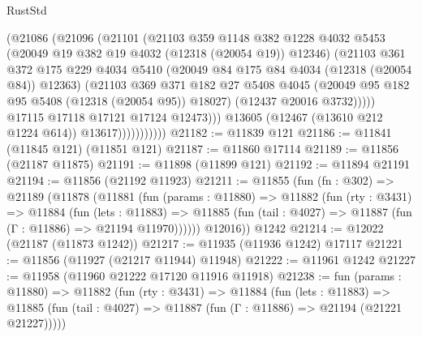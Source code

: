 \begin{lexlean}{RustStd}
\begin{coremodule}
                            (@21086
                              (@21096
                                (@21101
                                  (@21103
                                    @359
                                    @1148
                                    @382
                                    @1228
                                    @4032
                                    @5453
                                    (@20049 @19 @382 @19 @4032 (@12318 (@20054 @19)) @12346)
                                    (@21103
                                      @361
                                      @372
                                      @175
                                      @229
                                      @4034
                                      @5410
                                      (@20049 @84 @175 @84 @4034 (@12318 (@20054 @84)) @12363)
                                      (@21103
                                        @369
                                        @371
                                        @182
                                        @27
                                        @5408
                                        @4045
                                        (@20049 @95 @182 @95 @5408 (@12318 (@20054 @95)) @18027)
                                        (@12437 @20016 @3732)))))
                                @17115
                                @17118
                                @17121
                                @17124
                                @12473)))
                          @13605
                          (@12467 (@13610 @212 @1224 @614))
                          @13617)))))))))))
@21182 := @11839 @121
@21186 := @11841 (@11845 @121) (@11851 @121)
@21187 := @11860 @17114
@21189 := @11856 (@21187 @11875)
@21191 := @11898 (@11899 @121)
@21192 := @11894 @21191
@21194 := @11856 (@21192 @11923)
@21211 := @11855
    (fun (fn : @302) =>
    @21189
      (@11878
        (@11881
          (fun (params : @11880) =>
          @11882
            (fun (rty : @3431) =>
            @11884
              (fun (lets : @11883) =>
              @11885 (fun (tail : @4027) => @11887 (fun (Γ : @11886) => @21194 @11970))))))
        @12016))
    @1242
@21214 := @12022 (@21187 (@11873 @1242))
@21217 := @11935 (@11936 @1242) @17117
@21221 := @11856 (@11927 (@21217 @11944) @11948)
@21222 := @11961 @1242
@21227 := @11958 (@11960 @21222 @17120 @11916 @11918)
@21238 := fun (params : @11880) =>
  @11882
    (fun (rty : @3431) =>
    @11884
      (fun (lets : @11883) =>
      @11885 (fun (tail : @4027) => @11887 (fun (Γ : @11886) => @21194 (@21221 @21227)))))

\end{coremodule}
\end{lexlean}
